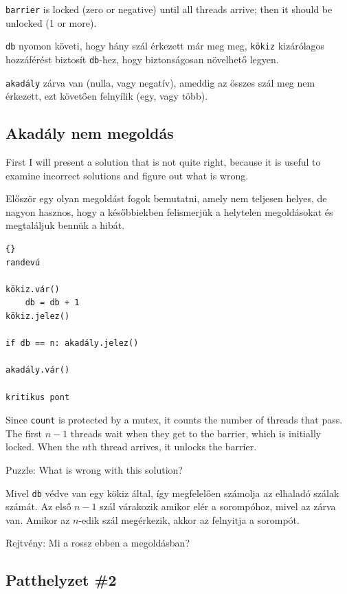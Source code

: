 \documentclass{book}
\newcommand{\clearemptydoublepage}{\newpage\cleardoublepage}
\begin{document}
{\tt barrier} is locked
(zero or negative) until all threads arrive; then it should
be unlocked (1 or more).

{\tt db} nyomon követi, hogy hány szál érkezett már meg
meg, {\tt kökiz} kizárólagos hozzáférést biztosít {\tt db}-hez, hogy biztonságosan
növelhető legyen.

{\tt akadály} zárva van (nulla, vagy negatív), ameddig az összes
szál meg nem érkezett, ezt követően felnyílik (egy, vagy több).


\clearemptydoublepage
\subsection{Akadály nem megoldás}

First I will present a solution that is not quite right, because
it is useful to examine incorrect solutions and figure out what
is wrong.

Először egy olyan megoldást fogok bemutatni, amely nem teljesen helyes, de
nagyon hasznos, hogy a későbbiekben felismerjük a helytelen megoldásokat
és megtaláljuk bennük a hibát.

\begin{lstlisting}[title={Akadály nem megoldás}]{}
randevú

kökiz.vár()
    db = db + 1
kökiz.jelez()

if db == n: akadály.jelez()

akadály.vár()

kritikus pont
\end{lstlisting}

Since {\tt count} is protected by a mutex, it counts the number of
threads that pass.  The first $n-1$ threads wait when they get to the
barrier, which is initially locked.  When the $n$th thread arrives, it
unlocks the barrier.

Puzzle:  What is wrong with this solution?

Mivel {\tt db} védve van egy kökiz által, így megfelelően számolja az elhaladó
szálak számát. Az első $n-1$ szál várakozik amikor elér a sorompóhoz, mivel
az zárva van. Amikor az $n$-edik szál megérkezik, akkor az felnyitja a sorompót.

Rejtvény: Mi a rossz ebben a megoldásban?


\clearemptydoublepage
\subsection{Patthelyzet \#2}
\end{document}

